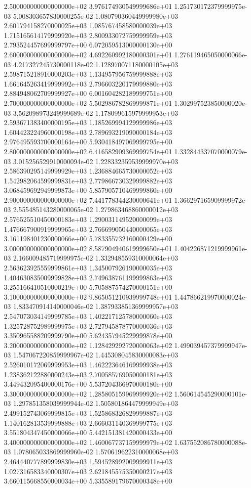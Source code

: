 \documentclass{article}
\begin{document}
\begin{center}
{2.500000000000000000e+02 3.976174930549999686e+01 1.251730172379999975e-03 5.008303657830000255e-02 1.080790360449999980e+03 2.601794158270000025e+03 1.085767458580000039e+03 1.715165614179999920e+03 2.800933072759999959e+03 2.793524457699999797e+00 6.072059513000000130e+00
2.600000000000000000e+02 4.692260992180000301e+01 1.276119465050000066e-03 4.217327245730000118e-02 1.128970071180000105e+03 2.598715218910000203e+03 1.134957956759999888e+03 1.661645263419999992e+03 2.796603220179999880e+03 2.884948062709999927e+00 6.001604282189999751e+00
2.700000000000000000e+02 5.502986782869999871e+01 1.302997523850000020e-03 3.562098973249999689e-02 1.178099615979999953e+03 2.593671383400000195e+03 1.185269994129999986e+03 1.604423224960000198e+03 2.789693219090000184e+03 2.976495593700000164e+00 5.930418497069999795e+00
2.800000000000000000e+02 6.416582909369999754e+01 1.332844337070000079e-03 3.015256529910000094e-02 1.228332359539999970e+03 2.586390295149999929e+03 1.236884665730000052e+03 1.542982064599999831e+03 2.779866730329999882e+03 3.068459692949999873e+00 5.857905710469999860e+00
2.900000000000000000e+02 7.441778344230000641e+01 1.366297165909999972e-03 2.555485143280000065e-02 1.279863468860000012e+03 2.576525510450000183e+03 1.290031149520000099e+03 1.476667900919999965e+03 2.766699050440000065e+03 3.161198401230000066e+00 5.783355732160000429e+00
3.000000000000000000e+02 8.587904940619999650e+01 1.404226871219999961e-03 2.166009485719999975e-02 1.332948559310000064e+03 2.563623925559999861e+03 1.345007926190000035e+03 1.404630835009999828e+03 2.749638761199999863e+03 3.255166410510000219e+00 5.705887574270000151e+00
3.100000000000000000e+02 9.865051210939999748e+01 1.447866219970000024e-03 1.833470914140000046e-02 1.387933851369999957e+03 2.547073034149999785e+03 1.402217125780000060e+03 1.325728752989999975e+03 2.727945878770000036e+03 3.350965588209999790e+00 5.624357945229999878e+00
3.200000000000000000e+02 1.128429292720000063e+02 1.499039457379999947e-03 1.547067220859999967e-02 1.445308045830000083e+03 2.526010172069999953e+03 1.462223646169999938e+03 1.238362122880000243e+03 2.700585769050000181e+03 3.449432095400000176e+00 5.537204366970000180e+00
3.300000000000000000e+02 1.285805159969999920e+02 1.560614545290000101e-03 1.297851358039999944e-02 1.505801864479999949e+03 2.499152743069999815e+03 1.525868326829999887e+03 1.140162813539999888e+03 2.666031140369999775e+03 3.551804347450000066e+00 5.442151381420000433e+00
3.400000000000000000e+02 1.460067737159999979e+02 1.637552086780000088e-03 1.078065033869999960e-02 1.570619622310000068e+03 2.464440777899999830e+03 1.594528992009999911e+03 1.027316583340000307e+03 2.621845575350000217e+03 3.660115668550000034e+00 5.335589179670000348e+00
}
\end{center}
\end{document}
